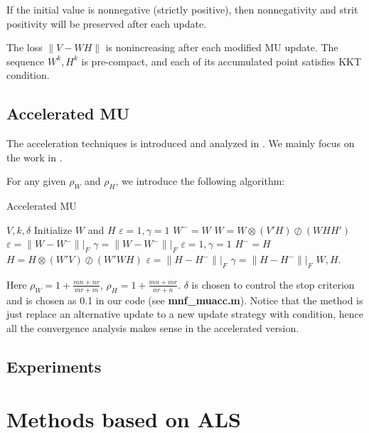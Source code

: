 \documentclass{article}
\begin{document}
\begin{proposition}
	If the initial value is nonnegative (strictly positive), then nonnegativity and strit positivity will be preserved after each update.
\end{proposition}

\begin{proposition}
	The loss $\|V-WH\|$ is nonincreasing after each modified MU update. The sequence $W^k, H^k$ is pre-compact, and each of its accumulated point satisfies KKT condition.
\end{proposition}

\subsection{Accelerated MU}
The acceleration techniques is introduced and analyzed in \cite{muacc, mumod2}. We mainly focus on the work in \cite{muacc}.

For any given $\rho_W$ and $\rho_H$, we introduce the following algorithm:
\begin{algorithm}[H]
	\caption{Accelerated MU}
	\begin{algorithmic}[1]
		\REQUIRE $V, k, \delta$
		\STATE Initialize $W$ and $H$ 
		\STATE $\varepsilon=1, \gamma = 1$
		\STATE $W^-=W$
		\STATE $ W = W\otimes (V'H) \oslash (WHH')$
		\STATE $\varepsilon = \|W-W^-\||_F$
		\ENDIF
		\STATE $\gamma = \|W-W^-\||_F$
		\ENDWHILE
		\STATE $\varepsilon=1, \gamma = 1$
		\STATE $H^-=H$
		\STATE $H = H\otimes (W'V) \oslash (W'WH) $
		\STATE $\varepsilon = \|H-H^-\||_F$
		\ENDIF
		\STATE $\gamma = \|H-H^-\||_F$
		\ENDWHILE
		\ENDWHILE
		\STATE \Return $W,H$.
	\end{algorithmic}
\end{algorithm}
Here $\rho_W = 1+\frac{mn+nr}{mr+m}$, $\rho_H = 1+\frac{mn+mr}{nr+n}$. $\delta$ is chosen to control the stop criterion and is chosen as 0.1 in our code (see \textbf{mnf\_muacc.m}).
Notice that the method is just replace an alternative update to a new update strategy with condition, hence all the convergence analysis makes sense in the accelerated version. 
\subsection{Experiments}
\section{Methods based on ALS}
\end{document}
